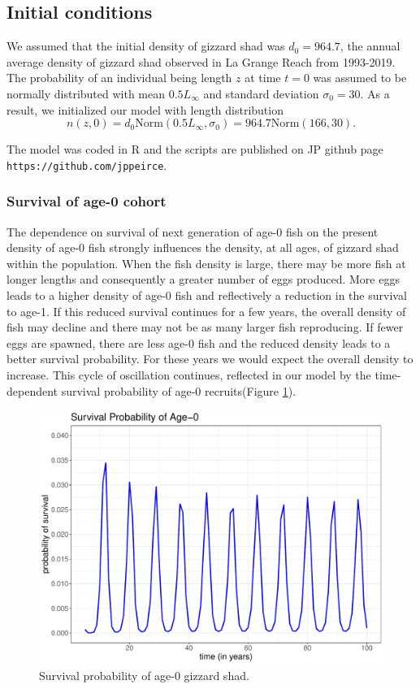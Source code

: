 \documentclass[preprint,review,12pt,authoryear]{elsarticle}
\begin{document}
\subsection{Initial conditions}  We assumed that the initial density of gizzard shad was $d_0 = 964.7$, the annual average density of gizzard shad observed in La Grange Reach from 1993-2019.  
The probability of an individual being length $z$ at time $t=0$  was assumed to be normally distributed with mean $0.5L_\infty$ and standard deviation $\sigma_0 = 30$.  
As a result, we initialized our model with length distribution
\begin{equation}\label{eq:n}
 n(z,0) = d_0 \mbox{Norm} (0.5 L_\infty, \sigma_0) = 964.7 \mbox{Norm} (166, 30). 
 \end{equation}

The model was coded in R \citep{R} and the scripts are published on JP github page \verb+https://github.com/jppeirce+.


\subsubsection{Survival of age-0 cohort} \label{sec:survival}
The dependence on survival of next generation of age-0 fish on the present density of age-0 fish strongly influences the density, at all ages, of gizzard shad within the population. 
When the fish density is large, there may be more fish at longer lengths and consequently a greater number of eggs produced.  
More eggs leads to a higher density of age-0 fish and reflectively a reduction in the survival to age-1.  
If this reduced survival continues for a few years, the overall density of fish may decline and there may not be as many larger fish reproducing.  
If fewer eggs are spawned, there are less age-0 fish and the reduced density leads to a better survival probability.  
For these years we would expect the overall density to increase.  
This cycle of oscillation continues, reflected in our model by the time-dependent survival probability of age-0 recruits(Figure \ref{fig:age0time}).

\begin{figure}
\centering
  \includegraphics[width=.4\textwidth]{figures/Figure2a.pdf}
   \caption{}
  \label{fig:age0time}
\caption{Survival probability of age-0 gizzard shad.}
\end{figure}    
\end{document}
